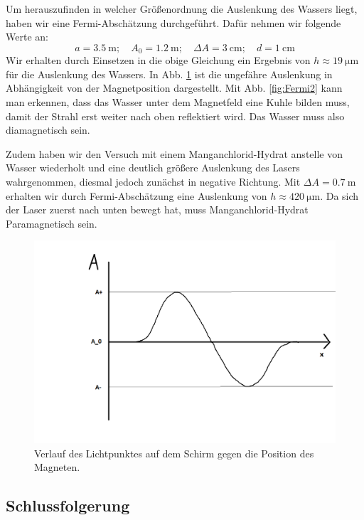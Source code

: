 \documentclass[11pt,a4paper,titlepage, ngerman]{article}
\begin{document}
			Um herauszufinden in welcher Größenordnung die Auslenkung des Wassers liegt, haben wir eine Fermi-Abschätzung durchgeführt.
			Dafür nehmen wir folgende Werte an:
			\begin{equation*}
				a = \SI{3,5}{\meter};\quad
				A_0 = \SI{1,2}{\meter};\quad
				\Delta A = \SI{3}{\centi\meter};\quad
				d = \SI{1}{\centi\meter}
			\end{equation*}
			Wir erhalten durch Einsetzen in die obige Gleichung ein Ergebnis von $h \approx \SI{19}{\micro\meter}$ für die Auslenkung des Wassers.
			In Abb. \ref{fig:zeitverlauf} ist die ungefähre Auslenkung in Abhängigkeit von der Magnetposition dargestellt. 
			Mit Abb. \ref{fig:Fermi2} kann man erkennen, dass das Wasser unter dem Magnetfeld eine Kuhle bilden muss, damit der Strahl erst weiter nach oben reflektiert wird.
			Das Wasser muss also diamagnetisch sein.
			
			Zudem haben wir den Versuch mit einem Manganchlorid-Hydrat anstelle von Wasser wiederholt und eine deutlich größere Auslenkung des Lasers wahrgenommen, diesmal jedoch zunächst in negative Richtung.
			Mit $\Delta A = \SI{0,7}{\meter}$ erhalten wir durch Fermi-Abschätzung eine Auslenkung von $h \approx \SI{420}{\micro\meter}$.
			Da sich der Laser zuerst nach unten bewegt hat, muss Manganchlorid-Hydrat Paramagnetisch sein.
			
			\begin{figure}[ht]
				\includegraphics[width=\textwidth]{SkizzeZeitverlaufLichtpunktWasser.png}
				\caption{Verlauf des Lichtpunktes auf dem Schirm gegen die Position des Magneten.}
				\label{fig:zeitverlauf}
			\end{figure}

		\subsection*{Schlussfolgerung}
		
\end{document}
